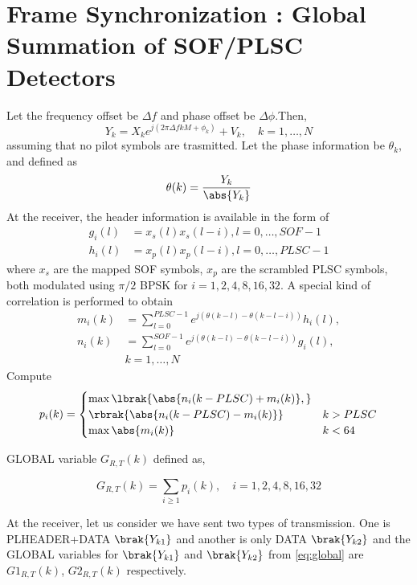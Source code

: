 \documentclass[journal,12pt,twocolumn]{IEEEtran}
\begin{document}
\section{Frame Synchronization : Global Summation of SOF/PLSC Detectors} 
%
%
Let the frequency offset be $\Delta f$ and phase offset be $\Delta \phi$.Then,
\begin{equation}
Y_k= X_k e^{j(2\pi\Delta fkM+\phi_k)} + V_k, \quad k = 1,\dots,N 
\end{equation}
%
assuming that no pilot symbols are trasmitted. 
Let the phase information be $\theta_k$, and defined as
%
\begin{equation}
\theta(k) = \frac{Y_k}{\abs{Y_k}}
\end{equation}
%
At the receiver, the header information is available in the form of 
\begin{align}
g_i(l)&=x_s(l)x_s(l-i), l = 0,\dots, SOF-1
\\
h_i(l)&=x_p(l)x_p(l-i), l = 0,\dots, PLSC-1
\end{align}
%
where $x_s$ are the mapped SOF symbols, $x_p$ are the scrambled PLSC  symbols, both  modulated using $\pi/2$ BPSK
for $i=1,2,4,8,16,32$.
A special kind of correlation is performed to obtain
\begin{align}
m_i(k)&=\sum_{l=0}^{PLSC-1} e^{j(\theta(k-l)-\theta(k-l-i))} h_i(l),
\\
n_i(k)&=\sum_{l=0}^{SOF-1} e^{j(\theta(k-l)-\theta(k-l-i))} g_i(l) ,
\\
&k = 1, \dots, N 
\end{align}
%
Compute
\begin{align}
p_i(k)=
\begin{cases}
\max \lbrak{\abs{n_i({k-PLSC})+m_i(k)},} &
\\
\rbrak{\abs{n_i({k-PLSC})-m_i(k)}} & k > PLSC
\\
\max \abs{m_i(k)}  & k < 64
\end{cases}
\end{align}

 GLOBAL variable $G_{R,T}(k)$  \cite{frame_offset} defined as,

\begin{equation}
G_{R,T}(k)=\sum_{i\geq1}p_i(k) , \quad i=1,2,4,8,16,32
\label{eq:global}
\end{equation}

At the receiver, let us consider we have sent two types of transmission. One is PLHEADER+DATA $\brak{Y_{k1}}$ and another is only DATA $\brak{Y_{k2}}$ and the GLOBAL variables for $\brak{Y_{k1}}$ and $\brak{Y_{k2}}$ from \eqref{eq:global} are $G1_{R,T}(k)$, $G2_{R,T}(k)$ respectively.
\end{document}
